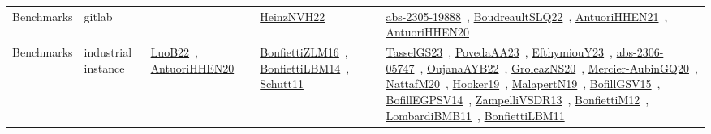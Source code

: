 {\begin{longtable}{lp{3cm}>{\raggedright\arraybackslash}p{6cm}>{\raggedright\arraybackslash}p{6cm}>{\raggedright\arraybackslash}p{8cm}}
Benchmarks & gitlab &  & \href{../works/HeinzNVH22.pdf}{HeinzNVH22}~\cite{HeinzNVH22} & \href{../works/abs-2305-19888.pdf}{abs-2305-19888}~\cite{abs-2305-19888}, \href{../works/BoudreaultSLQ22.pdf}{BoudreaultSLQ22}~\cite{BoudreaultSLQ22}, \href{../works/AntuoriHHEN21.pdf}{AntuoriHHEN21}~\cite{AntuoriHHEN21}, \href{../works/AntuoriHHEN20.pdf}{AntuoriHHEN20}~\cite{AntuoriHHEN20}\\
Benchmarks & industrial instance & \href{../works/LuoB22.pdf}{LuoB22}~\cite{LuoB22}, \href{../works/AntuoriHHEN20.pdf}{AntuoriHHEN20}~\cite{AntuoriHHEN20} & \href{../works/BonfiettiZLM16.pdf}{BonfiettiZLM16}~\cite{BonfiettiZLM16}, \href{../works/BonfiettiLBM14.pdf}{BonfiettiLBM14}~\cite{BonfiettiLBM14}, \href{../works/Schutt11.pdf}{Schutt11}~\cite{Schutt11} & \href{../works/TasselGS23.pdf}{TasselGS23}~\cite{TasselGS23}, \href{../works/PovedaAA23.pdf}{PovedaAA23}~\cite{PovedaAA23}, \href{../works/EfthymiouY23.pdf}{EfthymiouY23}~\cite{EfthymiouY23}, \href{../works/abs-2306-05747.pdf}{abs-2306-05747}~\cite{abs-2306-05747}, \href{../works/OujanaAYB22.pdf}{OujanaAYB22}~\cite{OujanaAYB22}, \href{../works/GroleazNS20.pdf}{GroleazNS20}~\cite{GroleazNS20}, \href{../works/Mercier-AubinGQ20.pdf}{Mercier-AubinGQ20}~\cite{Mercier-AubinGQ20}, \href{../works/NattafM20.pdf}{NattafM20}~\cite{NattafM20}, \href{../works/Hooker19.pdf}{Hooker19}~\cite{Hooker19}, \href{../works/MalapertN19.pdf}{MalapertN19}~\cite{MalapertN19}, \href{../works/BofillGSV15.pdf}{BofillGSV15}~\cite{BofillGSV15}, \href{../works/BofillEGPSV14.pdf}{BofillEGPSV14}~\cite{BofillEGPSV14}, \href{../works/ZampelliVSDR13.pdf}{ZampelliVSDR13}~\cite{ZampelliVSDR13}, \href{../works/BonfiettiM12.pdf}{BonfiettiM12}~\cite{BonfiettiM12}, \href{../works/LombardiBMB11.pdf}{LombardiBMB11}~\cite{LombardiBMB11}, \href{../works/BonfiettiLBM11.pdf}{BonfiettiLBM11}~\cite{BonfiettiLBM11}\\

\end{longtable}}
